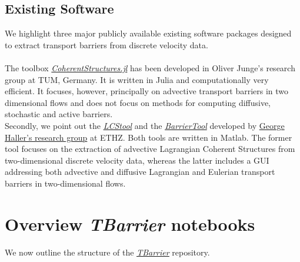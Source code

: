 \documentclass{article}
\begin{document}
\subsection{Existing Software}
We highlight three major publicly available existing software packages designed to extract transport barriers from discrete velocity data. \\ \\
The toolbox \textit{\href{https://coherentstructures.github.io/CoherentStructures.jl/stable/}{CoherentStructures.jl}} has been developed in Oliver Junge's research group at TUM, Germany. It is written in Julia and computationally very efficient. It focuses, however, principally on advective transport barriers in two dimensional flows and does not focus on methods for computing diffusive, stochastic and active barriers. \\ 

Secondly, we point out the \textit{\href{https://github.com/haller-group/LCStool}{LCStool}} and the \textit{\href{https://github.com/haller-group/BarrierTool}{BarrierTool}} developed by \href{http://georgehaller.com/}{George Haller's research group} at ETHZ. Both tools are written in Matlab. The former tool focuses on the extraction of advective Lagrangian Coherent Structures from two-dimensional discrete velocity data, whereas the latter includes a GUI addressing both advective and diffusive Lagrangian and Eulerian transport barriers in two-dimensional flows.

\section{Overview \textit{TBarrier} notebooks}

We now outline the structure of the \href{https://github.com/EncinasBartos/TBarrier}{\textit{\underline{TBarrier}}} repository.
\end{document}
